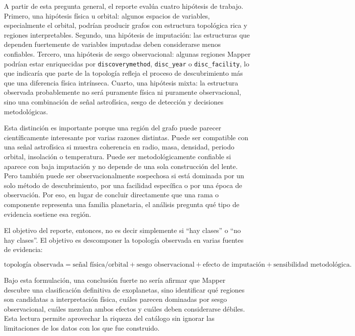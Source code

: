 A partir de esta pregunta general, el reporte evalúa cuatro hipótesis de trabajo. Primero, una hipótesis física u orbital: algunos espacios de variables, especialmente el orbital, podrían producir grafos con estructura topológica rica y regiones interpretables. Segundo, una hipótesis de imputación: las estructuras que dependen fuertemente de variables imputadas deben considerarse menos confiables. Tercero, una hipótesis de sesgo observacional: algunas regiones Mapper podrían estar enriquecidas por \texttt{discoverymethod}, \texttt{disc\_year} o \texttt{disc\_facility}, lo que indicaría que parte de la topología refleja el proceso de descubrimiento más que una diferencia física intrínseca. Cuarto, una hipótesis mixta: la estructura observada probablemente no será puramente física ni puramente observacional, sino una combinación de señal astrofísica, sesgo de detección y decisiones metodológicas.

Esta distinción es importante porque una región del grafo puede parecer científicamente interesante por varias razones distintas. Puede ser compatible con una señal astrofísica si muestra coherencia en radio, masa, densidad, periodo orbital, insolación o temperatura. Puede ser metodológicamente confiable si aparece con baja imputación y no depende de una sola construcción del lente. Pero también puede ser observacionalmente sospechosa si está dominada por un solo método de descubrimiento, por una facilidad específica o por una época de observación. Por eso, en lugar de concluir directamente que una rama o componente representa una familia planetaria, el análisis pregunta qué tipo de evidencia sostiene esa región.

El objetivo del reporte, entonces, no es decir simplemente si ``hay clases'' o ``no hay clases''. El objetivo es descomponer la topología observada en varias fuentes de evidencia:

\[
\text{topología observada}
=
\text{señal física/orbital}
+
\text{sesgo observacional}
+
\text{efecto de imputación}
+
\text{sensibilidad metodológica}.
\]

Bajo esta formulación, una conclusión fuerte no sería afirmar que Mapper descubre una clasificación definitiva de exoplanetas, sino identificar qué regiones son candidatas a interpretación física, cuáles parecen dominadas por sesgo observacional, cuáles mezclan ambos efectos y cuáles deben considerarse débiles. Esta lectura permite aprovechar la riqueza del catálogo sin ignorar las limitaciones de los datos con los que fue construido.